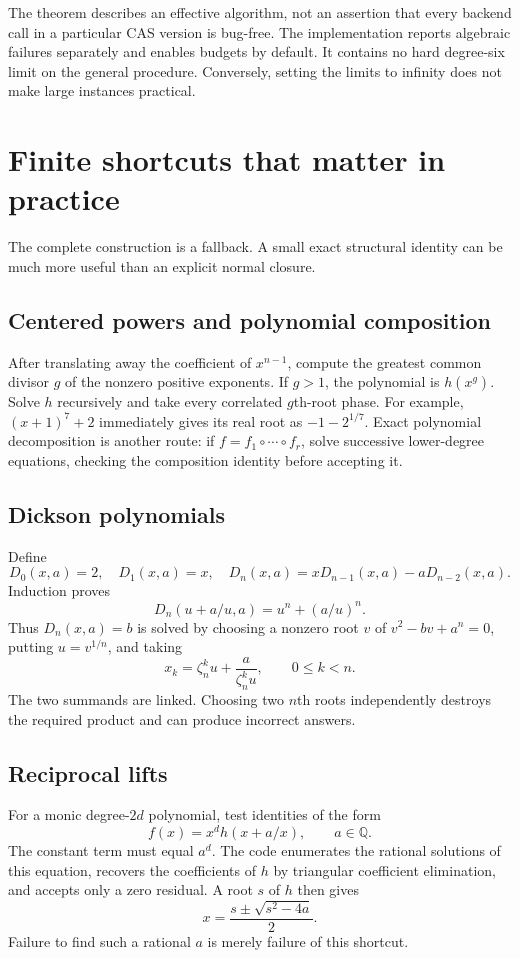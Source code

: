 \documentclass[11pt,a4paper]{article}
\theoremstyle{definition}\newtheorem{definition}[theorem]{Definition}
\theoremstyle{remark}\newtheorem{remark}[theorem]{Remark}
\newcommand{\Q}{\mathbb Q}\newcommand{\C}{\mathbb C}
\begin{document}
The theorem describes an effective algorithm, not an assertion that every
backend call in a particular CAS version is bug-free. The implementation
reports algebraic failures separately and enables budgets by default. It
contains no hard degree-six limit on the general procedure. Conversely,
setting the limits to infinity does not make large instances practical.

\section{Finite shortcuts that matter in practice}
The complete construction is a fallback. A small exact structural identity
can be much more useful than an explicit normal closure.

\subsection{Centered powers and polynomial composition}
After translating away the coefficient of $x^{n-1}$, compute the greatest
common divisor $g$ of the nonzero positive exponents. If $g>1$, the polynomial
is $h(x^g)$. Solve $h$ recursively and take every correlated $g$th-root phase.
For example, $(x+1)^7+2$ immediately gives its real root as
$-1-2^{1/7}$. Exact polynomial decomposition is another route: if
$f=f_1\circ\cdots\circ f_r$, solve successive lower-degree equations,
checking the composition identity before accepting it.

\subsection{Dickson polynomials}
Define
\[
 D_0(x,a)=2,\quad D_1(x,a)=x,\quad
 D_n(x,a)=xD_{n-1}(x,a)-aD_{n-2}(x,a).
\]
Induction proves
\[
 D_n(u+a/u,a)=u^n+(a/u)^n.
\]
Thus $D_n(x,a)=b$ is solved by choosing a nonzero root $v$ of
$v^2-bv+a^n=0$, putting $u=v^{1/n}$, and taking
\[
 x_k=\zeta_n^k u+\frac{a}{\zeta_n^k u},\qquad 0\le k<n.
\]
The two summands are linked. Choosing two $n$th roots independently destroys
the required product and can produce incorrect answers.

\subsection{Reciprocal lifts}
For a monic degree-$2d$ polynomial, test identities of the form
\[
 f(x)=x^d h(x+a/x),\qquad a\in\Q.
\]
The constant term must equal $a^d$. The code enumerates the rational
solutions of this equation, recovers the coefficients of $h$ by triangular
coefficient elimination, and accepts only a zero residual. A root $s$ of $h$
then gives
\[
 x=\frac{s\pm\sqrt{s^2-4a}}2.
\]
Failure to find such a rational $a$ is merely failure of this shortcut.
\end{document}
